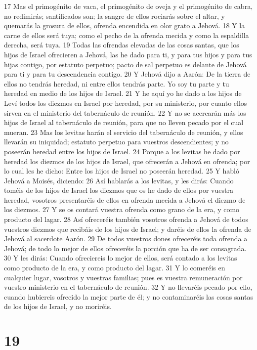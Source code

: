 17 Mas el primogénito de vaca, el primogénito de oveja y el primogénito de cabra, no redimirás; santificados son; la sangre de ellos rociarás sobre el altar, y quemarás la grosura de ellos, ofrenda encendida en olor grato a Jehová.
18 Y la carne de ellos será tuya; como el pecho de la ofrenda mecida y como la espaldilla derecha, será tuya.
19 Todas las ofrendas elevadas de las cosas santas, que los hijos de Israel ofrecieren a Jehová, las he dado para ti, y para tus hijos y para tus hijas contigo, por estatuto perpetuo; pacto de sal perpetuo es delante de Jehová para ti y para tu descendencia contigo.
20 Y Jehová dijo a Aarón: De la tierra de ellos no tendrás heredad, ni entre ellos tendrás parte. Yo soy tu parte y tu heredad en medio de los hijos de Israel.
21 Y he aquí yo he dado a los hijos de Leví todos los diezmos  en Israel por heredad, por su ministerio, por cuanto ellos sirven en el ministerio del tabernáculo de reunión.
22 Y no se acercarán más los hijos de Israel al tabernáculo de reunión, para que no lleven pecado por el cual mueran.
23 Mas los levitas harán el servicio del tabernáculo de reunión, y ellos llevarán su iniquidad; estatuto perpetuo para vuestros descendientes; y no poseerán heredad entre los hijos de Israel.
24 Porque a los levitas he dado por heredad los diezmos de los hijos de Israel, que ofrecerán a Jehová en ofrenda; por lo cual les he dicho: Entre los hijos de Israel no poseerán heredad.
25 Y habló Jehová a Moisés, diciendo:
26 Así hablarás a los levitas, y les dirás: Cuando toméis de los hijos de Israel los diezmos que os he dado de ellos por vuestra heredad, vosotros presentaréis de ellos en ofrenda mecida a Jehová el diezmo de los diezmos.
27 Y se os contará vuestra ofrenda como grano de la era, y como producto del lagar.
28 Así ofreceréis también vosotros ofrenda a Jehová de todos vuestros diezmos que recibáis de los hijos de Israel; y daréis de ellos la ofrenda de Jehová al sacerdote Aarón.
29 De todos vuestros dones ofreceréis toda ofrenda a Jehová; de todo lo mejor de ellos ofreceréis la porción que ha de ser consagrada.
30 Y les dirás: Cuando ofreciereis lo mejor de ellos, será contado a los levitas como producto de la era, y como producto del lagar.
31 Y lo comeréis en cualquier lugar, vosotros y vuestras familias; pues es vuestra remuneración por vuestro ministerio en el tabernáculo de reunión.
32 Y no llevaréis pecado por ello, cuando hubiereis ofrecido la mejor parte de él; y no contaminaréis las cosas santas de los hijos de Israel, y no moriréis. 


\chapter{19}

